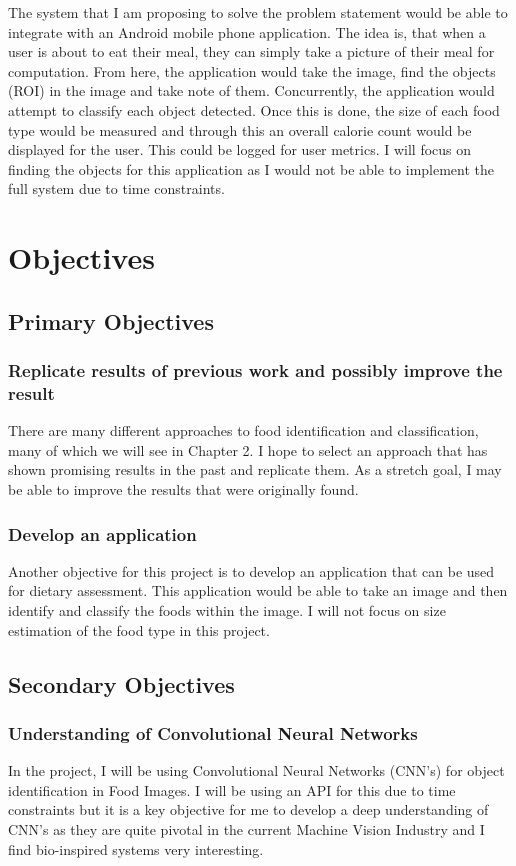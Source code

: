 The system that I am proposing to solve the problem statement would be able to
integrate with an Android mobile phone application.
The idea is, that when a user is about to eat their meal, they can simply take a picture of their meal for computation.
From here, the application would take the image, find the objects (ROI) in the image and take note of them.
Concurrently, the application would attempt to classify each object detected.
Once this is done, the size of each food type would be measured and through this an overall calorie count would be displayed for the user.
This could be logged for user metrics. 
I will focus on finding the objects for this application as I would not be able to implement the full system due to time constraints.

\section{Objectives}
\subsection{Primary Objectives}
\subsubsection{Replicate results of previous work and possibly improve the
result}
There are many different approaches to food identification and classification,
many of which we will see in Chapter 2. I hope to select an approach that has
shown promising results in the past and replicate them. As a stretch goal, I may
be able to improve the results that were originally found.

\subsubsection{Develop an application}
Another objective for this project is to develop an application that can be used
for dietary assessment. This application would be able to take an image and then
identify and classify the foods within the image. I will not focus on size
estimation of the food type in this project.

\subsection{Secondary Objectives}
\subsubsection{Understanding of Convolutional Neural Networks}
In the project, I will be using Convolutional Neural Networks (CNN's) for object identification in Food Images.
I will be using an API for this due to time constraints but it is a key
objective for me to develop a deep understanding of CNN's as they are quite pivotal in the current Machine Vision Industry and I find bio-inspired systems very interesting.


